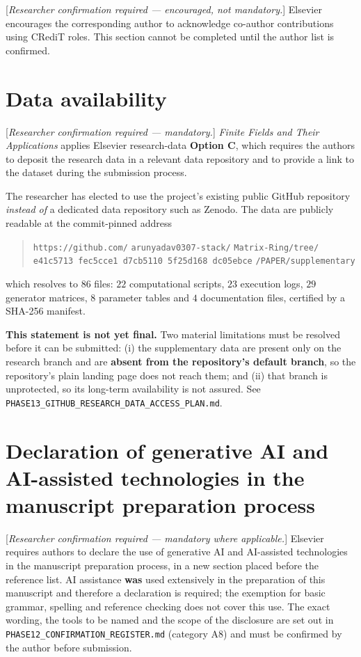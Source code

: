 \documentclass[11pt,a4paper]{article}
\theoremstyle{plain}
\theoremstyle{definition}
\theoremstyle{remark}
\begin{document}
[\emph{Researcher confirmation required --- encouraged, not mandatory.}] Elsevier
encourages the corresponding author to acknowledge co-author contributions
using CRediT roles. This section cannot be completed until the author list is
confirmed.

\section*{Data availability}
\label{sec:dataavailability}

[\emph{Researcher confirmation required --- mandatory.}] \emph{Finite Fields
and Their Applications} applies Elsevier research-data \textbf{Option C},
which requires the authors to deposit the research data in a relevant data
repository and to provide a link to the dataset during the submission process.

The researcher has elected to use the project's existing public GitHub
repository \emph{instead of} a dedicated data repository such as Zenodo. The
data are publicly readable at the commit-pinned address

\begin{quote}\small\raggedright
\texttt{https://github.com/}
\texttt{arunyadav0307-stack/}
\texttt{Matrix-Ring/tree/}
\texttt{e41c5713 fec5cce1 d7cb5110 5f25d168 dc05ebce}
\texttt{/PAPER/supplementary}
\end{quote}

which resolves to $86$ files: $22$ computational scripts, $23$ execution logs,
$29$ generator matrices, $8$ parameter tables and $4$ documentation files,
certified by a SHA-256 manifest.

\textbf{This statement is not yet final.} Two material limitations must be
resolved before it can be submitted: (i) the supplementary data are present
only on the research branch and are \textbf{absent from the repository's
default branch}, so the repository's plain landing page does not reach them;
and (ii) that branch is unprotected, so its long-term availability is not
assured. See \texttt{PHASE13\_GITHUB\_RESEARCH\_DATA\_ACCESS\_PLAN.md}.

\section*{Declaration of generative AI and AI-assisted technologies in the
manuscript preparation process}
\label{sec:genai}

[\emph{Researcher confirmation required --- mandatory where applicable.}] Elsevier
requires authors to declare the use of generative AI and AI-assisted
technologies in the manuscript preparation process, in a new section placed
before the reference list. AI assistance \textbf{was} used extensively in the
preparation of this manuscript and therefore a declaration is required; the
exemption for basic grammar, spelling and reference checking does not cover
this use. The exact wording, the tools to be named and the scope of the
disclosure are set out in
\texttt{PHASE12\_CONFIRMATION\_REGISTER.md} (category A8) and must be confirmed by
the author before submission.


\appendix





\end{document}
